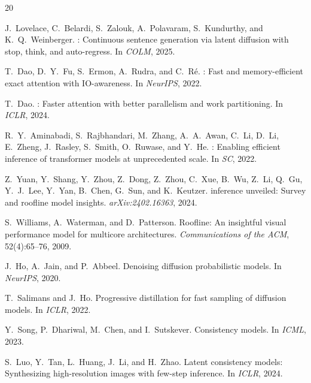 \documentclass[sigconf,authordraft]{acmart}
\begin{document}

\begin{thebibliography}{20}

J.~Lovelace, C.~Belardi, S.~Zalouk, A.~Polavaram, S.~Kundurthy, and K.~Q.~Weinberger.
: Continuous sentence generation via latent diffusion with stop, think, and auto-regress.
\newblock In \emph{COLM}, 2025.

T.~Dao, D.~Y.~Fu, S.~Ermon, A.~Rudra, and C.~R\'{e}.
: Fast and memory-efficient exact attention with {IO}-awareness.
\newblock In \emph{NeurIPS}, 2022.

T.~Dao.
: Faster attention with better parallelism and work partitioning.
\newblock In \emph{ICLR}, 2024.

R.~Y.~Aminabadi, S.~Rajbhandari, M.~Zhang, A.~A.~Awan, C.~Li, D.~Li, E.~Zheng, J.~Rasley, S.~Smith, O.~Ruwase, and Y.~He.
: Enabling efficient inference of transformer models at unprecedented scale.
\newblock In \emph{SC}, 2022.

Z.~Yuan, Y.~Shang, Y.~Zhou, Z.~Dong, Z.~Zhou, C.~Xue, B.~Wu, Z.~Li, Q.~Gu, Y.~J.~Lee, Y.~Yan, B.~Chen, G.~Sun, and K.~Keutzer.
 inference unveiled: Survey and roofline model insights.
\newblock \emph{arXiv:2402.16363}, 2024.

S.~Williams, A.~Waterman, and D.~Patterson.
\newblock Roofline: An insightful visual performance model for multicore architectures.
\newblock \emph{Communications of the ACM}, 52(4):65--76, 2009.

J.~Ho, A.~Jain, and P.~Abbeel.
\newblock Denoising diffusion probabilistic models.
\newblock In \emph{NeurIPS}, 2020.

T.~Salimans and J.~Ho.
\newblock Progressive distillation for fast sampling of diffusion models.
\newblock In \emph{ICLR}, 2022.

Y.~Song, P.~Dhariwal, M.~Chen, and I.~Sutskever.
\newblock Consistency models.
\newblock In \emph{ICML}, 2023.

S.~Luo, Y.~Tan, L.~Huang, J.~Li, and H.~Zhao.
\newblock Latent consistency models: Synthesizing high-resolution images with few-step inference.
\newblock In \emph{ICLR}, 2024.


\end{thebibliography}
\end{document}
